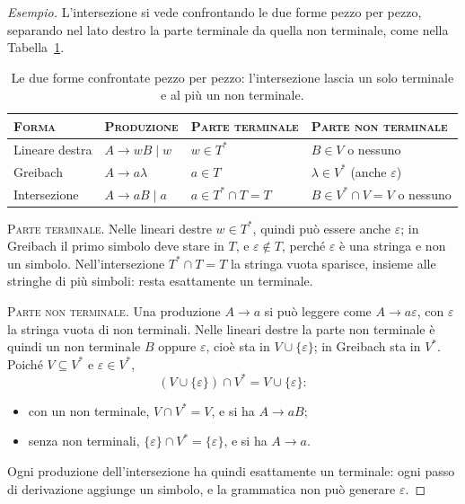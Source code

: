 \documentclass[a4paper, 11pt, oneside]{book}
\theoremstyle{formale}
\newenvironment{esempio}
    {\begin{proof}[\textit{Esempio}]\renewcommand{\qedsymbol}{$\diamond$}}
    {\end{proof}}
\begin{document}
    \begin{esempio}
        L'intersezione si vede confrontando le due forme pezzo per pezzo, separando nel
        lato destro la parte terminale da quella non terminale, come nella
        Tabella~\ref{tab:lineare-greibach}.

        \begin{table}[H]
            \centering
            \begin{tabular}{llll}
                \toprule
                \textsc{Forma} & \textsc{Produzione} & \textsc{Parte terminale}
                    & \textsc{Parte non terminale} \\
                \midrule
                Lineare destra & $A \to wB \mid w$ & $w \in T^*$ & $B \in V$ o nessuno \\
                Greibach & $A \to a\lambda$ & $a \in T$
                    & $\lambda \in V^*$ (anche $\varepsilon$) \\
                \midrule
                Intersezione & $A \to aB \mid a$ & $a \in T^* \cap T = T$
                    & $B \in V^* \cap V = V$ o nessuno \\
                \bottomrule
            \end{tabular}
            \caption{Le due forme confrontate pezzo per pezzo: l'intersezione lascia un
                solo terminale e al pi\`u un non terminale.}
            \label{tab:lineare-greibach}
        \end{table}

        \textsc{Parte terminale}. Nelle lineari destre $w \in T^*$, quindi pu\`o essere
        anche $\varepsilon$; in Greibach il primo simbolo deve stare in $T$, e
        $\varepsilon \notin T$, perch\'e $\varepsilon$ \`e una stringa e non un simbolo.
        Nell'intersezione $T^* \cap T = T$ la stringa vuota sparisce, insieme alle stringhe
        di pi\`u simboli: resta esattamente un terminale.

        \textsc{Parte non terminale}. Una produzione $A \to a$ si pu\`o leggere come
        $A \to a\varepsilon$, con $\varepsilon$ la stringa vuota di non terminali. Nelle
        lineari destre la parte non terminale \`e quindi un non terminale $B$ oppure
        $\varepsilon$, cio\`e sta in $V \cup \{\varepsilon\}$; in Greibach sta in $V^*$.
        Poich\'e $V \subseteq V^*$ e $\varepsilon \in V^*$,
        \begin{equation*}
            (V \cup \{\varepsilon\}) \cap V^* = V \cup \{\varepsilon\}:
        \end{equation*}
        \begin{itemize}
            \item con un non terminale, $V \cap V^* = V$, e si ha $A \to aB$;
            \item senza non terminali, $\{\varepsilon\} \cap V^* = \{\varepsilon\}$, e si
                ha $A \to a$.
        \end{itemize}
        Ogni produzione dell'intersezione ha quindi esattamente un terminale: ogni passo
        di derivazione aggiunge un simbolo, e la grammatica non pu\`o generare
        $\varepsilon$.
    \end{esempio}
\end{document}

